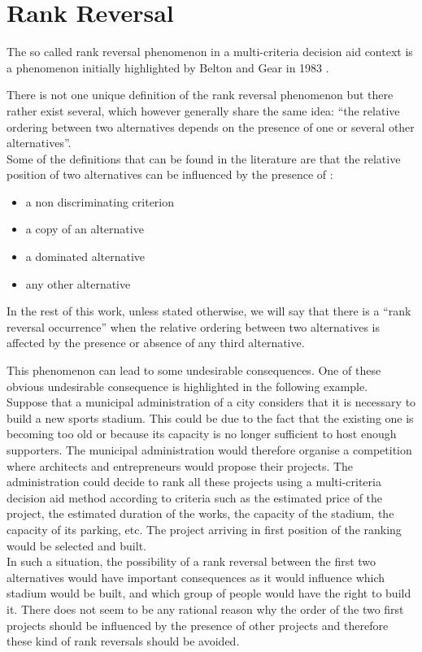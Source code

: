 \chapter{Rank Reversal}
\label{chap:rank_reversal}

The so called rank reversal phenomenon in a multi-criteria decision aid context is a phenomenon initially highlighted by Belton and Gear in 1983 \cite{belton1983short}\cite{wang2009rank}.

There is not one unique definition of the rank reversal phenomenon but there rather exist several, which however generally share the same idea: ``the relative ordering between two alternatives depends on the presence of one or several other alternatives''. \\
Some of the definitions that can be found in the literature are that the relative position of two alternatives can be influenced by the presence of \cite{Brans2016}:
\begin{itemize}
    \item a non discriminating criterion
    \item a copy of an alternative
    \item a dominated alternative
    \item any other alternative
\end{itemize}

In the rest of this work, unless stated otherwise, we will say that there is a ``rank reversal occurrence'' when the relative ordering between two alternatives is affected by the presence or absence of any third alternative.

This phenomenon can lead to some undesirable consequences. One of these obvious undesirable consequence is highlighted in the following example. \\
Suppose that a municipal administration of a city considers that it is necessary to build a new sports stadium. This could be due to the fact that the existing one is becoming too old or because its capacity is no longer sufficient to host enough supporters.
The municipal administration would therefore organise a competition where architects and entrepreneurs would propose their projects.
The administration could decide to rank all these projects using a multi-criteria decision aid method according to criteria such as the estimated price of the project, the estimated duration of the works, the capacity of the stadium, the capacity of its parking, etc.
The project arriving in first position of the ranking would be selected and built.\\
In such a situation, the possibility of a rank reversal between the first two alternatives would have important consequences as it would influence which stadium would be built, and which group of people would have the right to build it.
There does not seem to be any rational reason why the order of the two first projects should be influenced by the presence of other projects and therefore these kind of rank reversals should be avoided.

